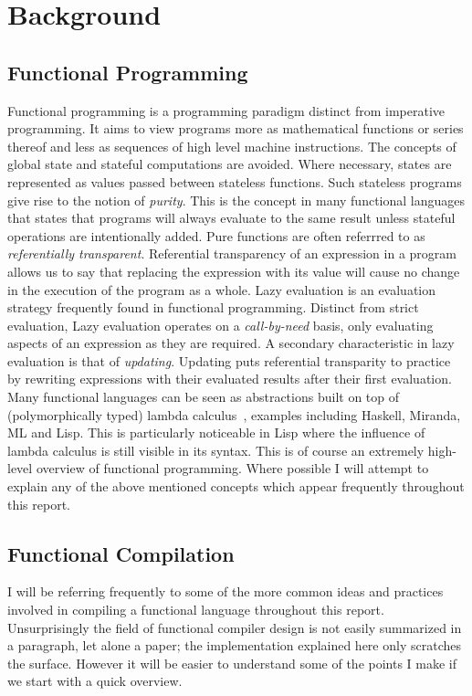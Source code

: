 
\section{Background}
\subsection{Functional Programming}
Functional programming is a programming paradigm distinct from imperative
programming. It aims to view programs more as mathematical functions or series
thereof and less as sequences of high level machine instructions. The concepts
of global state and stateful computations are avoided. Where necessary, states
are represented as values passed between stateless functions. Such stateless
programs give rise to the notion of \emph{purity}. This is the concept in many functional
languages that states that programs will always evaluate to the same result unless
stateful operations are intentionally added. Pure functions are often referrred
to as \emph{referentially transparent}. Referential transparency of an expression in a
program allows us to say that replacing the expression with its value will cause
no change in the execution of the program as a whole. Lazy evaluation is an
evaluation strategy frequently found in functional programming. Distinct from
strict evaluation, Lazy evaluation operates on a \emph{call-by-need} basis, only
evaluating aspects of an expression as they are required. A secondary characteristic
in lazy evaluation is that of \emph{updating}. Updating puts referential
transparity to practice by rewriting expressions with their evaluated results after
their first evaluation. Many functional languages can be seen as abstractions built
on top of (polymorphically typed) lambda calculus~\cite[pp.37]{SPJ}, examples including 
Haskell, Miranda, ML and Lisp. This is particularly noticeable in Lisp where the 
influence of lambda calculus is still visible in its syntax. This is of course 
an extremely high-level overview of functional programming. Where possible I will attempt to explain 
any of the above mentioned concepts which appear frequently throughout this report. 

\subsection{Functional Compilation}
I will be referring frequently to some of the more common ideas and practices
involved in compiling a functional language throughout this report. Unsurprisingly
the field of functional compiler design is not easily summarized in a paragraph,
let alone a paper; the implementation explained here only scratches the surface.
However it will be easier to understand some of the points I make if we start
with a quick overview.

